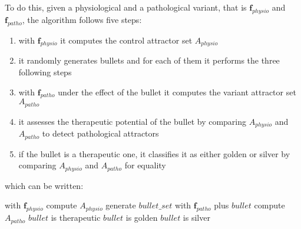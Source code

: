 \documentclass[oneside,a4paper,onecolumn,notitlepage]{article}
\begin{document}
To do this, given a physiological and a pathological variant, that is $\boldsymbol{f}_{physio}$ and $\boldsymbol{f}_{patho}$, the algorithm follows five steps:
\begin{enumerate}
\item with $\boldsymbol{f}_{physio}$ it computes the control attractor set $A_{physio}$
\item it randomly generates bullets and for each of them it performs the three following steps
\item with $\boldsymbol{f}_{patho}$ under the effect of the bullet it computes the variant attractor set $A_{patho}$
\item it assesses the therapeutic potential of the bullet by comparing $A_{physio}$ and $A_{patho}$ to detect pathological attractors
\item if the bullet is a therapeutic one, it classifies it as either golden or silver by comparing $A_{physio}$ and $A_{patho}$ for equality
\end{enumerate}
which can be written:
\begin{algorithmic}[1]
\STATE with $\boldsymbol{f}_{physio}$ compute $A_{physio}$
\STATE generate $bullet\_set$
    \STATE with $\boldsymbol{f}_{patho}$ plus $bullet$ compute $A_{patho}$
        \STATE $bullet$ is therapeutic
            \STATE $bullet$ is golden
        \ELSE
            \STATE $bullet$ is silver
        \ENDIF
    \ENDIF
\ENDFOR
\end{algorithmic}
\end{document}
